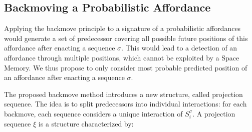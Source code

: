 \documentclass[conference]{IEEEtran}
\begin{document}


\subsection{Backmoving a Probabilistic Affordance}\label{backmove}

Applying the backmove principle to a signature of a probabilistic affordances would generate a set of predecessor covering all possible future positions of this affordance after enacting a sequence $\sigma$. This would lead to a detection of an affordance through multiple positions, which
cannot be exploited by a Space Memory.
We thus propose to only consider most probable predicted position of an affordance after enacting a sequence $\sigma$.

The proposed backmove method introduces a new structure, called projection sequence. The idea is to split predecessors into individual interactions: for each backmove, each sequence considers a unique interaction of $S_i^{\sigma}$.
A projection sequence $\xi$ is a structure characterized by:
\end{document}
